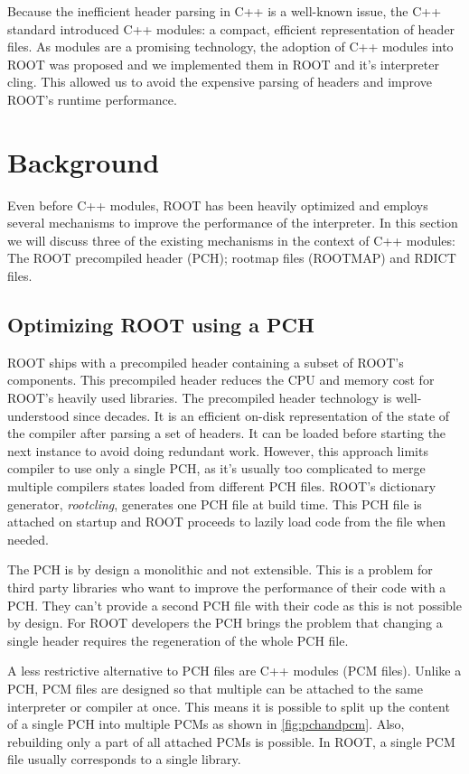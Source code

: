 \documentclass{webofc}
\begin{document}
Because the inefficient header parsing in C++ is a well-known issue, the C++ standard introduced C++ modules: a compact, efficient representation of header files. As modules are a promising technology, the adoption of C++ modules into ROOT was proposed \cite{vassil-paper} and we implemented them in ROOT and it's interpreter cling. This allowed us to avoid the expensive parsing of headers and improve ROOT's runtime performance.

\section{Background}
\label{background}

Even before C++ modules, ROOT has been heavily optimized and employs several mechanisms to improve the performance of the interpreter. In this section we will discuss three of the existing mechanisms in the context of C++ modules: The ROOT precompiled header (PCH); rootmap files (ROOTMAP) and RDICT files.

\subsection{Optimizing ROOT using a PCH}
\label{pch}

ROOT ships with a precompiled header containing a subset of ROOT's components. This precompiled header reduces the CPU and memory cost for ROOT’s heavily used libraries. The precompiled header technology is well-understood since decades. It is an efficient on-disk representation of the state of the compiler after parsing a set of headers. It can be loaded before starting the next instance to avoid doing redundant work. However, this approach limits compiler to use only a single PCH, as it's usually too complicated to merge multiple compilers states loaded from different PCH files. ROOT’s dictionary generator, \textit{rootcling}, generates one PCH file at build time. This PCH file is attached on startup and ROOT proceeds to lazily load code from the file when needed.

The PCH is by design a monolithic and not extensible. This is a problem for third party libraries who want to improve the performance of their code with a PCH. They can't provide a second PCH file with their code as this is not possible by design. For ROOT developers the PCH brings the problem that changing a single header requires the regeneration of the whole PCH file.

A less restrictive alternative to PCH files are C++ modules (PCM files). Unlike a PCH, PCM files are designed so that multiple can be attached to the same interpreter or compiler at once. This means it is possible to split up the content of a single PCH into multiple PCMs as shown in \ref{fig:pchandpcm}. Also, rebuilding only a part of all attached PCMs is possible. In ROOT, a single PCM file usually corresponds to a single library.
\end{document}
